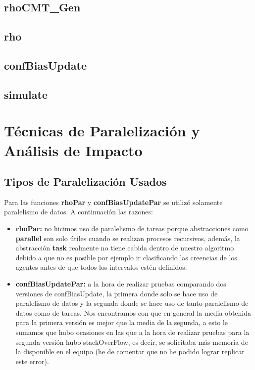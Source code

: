 \documentclass{article}
\begin{document}
    \subsection{rhoCMT\_Gen}

    \subsection{rho}

    \subsection{confBiasUpdate}

    \subsection{simulate}

  \section{Técnicas de Paralelización y Análisis de Impacto}

    \subsection{Tipos de Paralelización Usados}
    Para las funciones \textbf{rhoPar} y \textbf{confBiasUpdatePar} se utilizó solamente paralelismo de datos. A continuación  las razones:

    \begin{itemize}
      \item \textbf{rhoPar:} no hicimos uso de paralelismo de tareas porque abstracciones como \textbf{parallel} son solo útiles cuando se realizan procesos recursivos, además, la abstracción \textbf{task} realmente no tiene cabida dentro de nuestro algoritmo debido a que no es posible por ejemplo ir clasificando las creencias de los agentes antes de que todos los intervalos estén definidos.
      \item \textbf{confBiasUpdatePar:} a la hora de realizar pruebas comparando dos versiones de confBiasUpdate, la primera donde solo se hace uso de paralelismo de datos y la segunda donde se hace uso de tanto paralelismo de datos como de tareas. Nos encontramos con que en general la media obtenida para la primera versión es mejor que la media de la segunda, a esto le sumamos que hubo ocasiones en las que a la hora de realizar pruebas para la segunda versión hubo stackOverFlow, es decir, se solicitaba más memoria de la disponible en el equipo (he de comentar que no he podido lograr replicar este error).
    \end{itemize}
\end{document}
